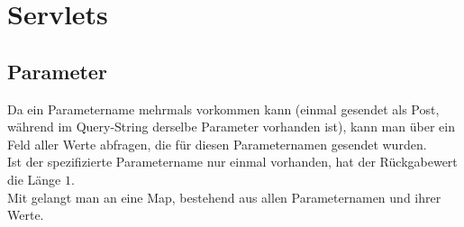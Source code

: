 \section{Servlets}

\subsection{Parameter}
Da ein Parametername mehrmals vorkommen kann (einmal gesendet als Post, während im Query-String derselbe Parameter vorhanden ist), kann man über  ein Feld aller Werte abfragen, die für diesen Parameternamen gesendet wurden.\\
Ist der spezifizierte Parametername nur einmal vorhanden, hat der Rückgabewert die Länge $1$.\\
Mit  gelangt man an eine Map, bestehend aus allen Parameternamen und ihrer Werte.